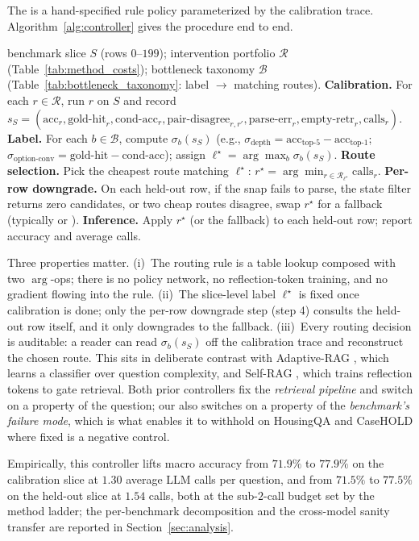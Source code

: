 The \controller{} is a hand-specified rule policy parameterized by the
calibration trace. Algorithm~\ref{alg:controller} gives the procedure end
to end.

\begin{algorithm*}[t]
\caption{Bottleneck-aware diagnostic adaptation.}
\label{alg:controller}
\begin{algorithmic}[1]
\REQUIRE benchmark slice $S$ (rows $0$--$199$); intervention portfolio $\mathcal{R}$ (Table~\ref{tab:method_costs}); bottleneck taxonomy $\mathcal{B}$ (Table~\ref{tab:bottleneck_taxonomy}: label $\to$ matching routes).
\STATE \textbf{Calibration.} For each $r \in \mathcal{R}$, run $r$ on $S$ and record $s_S = (\text{acc}_r, \text{gold-hit}_r, \text{cond-acc}_r, \text{pair-disagree}_{r,r'}, \text{parse-err}_r, \text{empty-retr}_r, \text{calls}_r)$.
\STATE \textbf{Label.} For each $b \in \mathcal{B}$, compute $\sigma_b(s_S)$ (e.g., $\sigma_{\text{depth}} = \text{acc}_{\text{top-5}} - \text{acc}_{\text{top-1}}$; $\sigma_{\text{option-conv}} = \text{gold-hit} - \text{cond-acc}$); assign $\ell^\star = \arg\max_b \sigma_b(s_S)$.
\STATE \textbf{Route selection.} Pick the cheapest route matching $\ell^\star$: $r^\star = \arg\min_{r \in \mathcal{R}_{\ell^\star}} \text{calls}_r$.
\STATE \textbf{Per-row downgrade.} On each held-out row, if the snap fails to parse, the state filter returns zero candidates, or two cheap routes disagree, swap $r^\star$ for a fallback (typically  or ).
\STATE \textbf{Inference.} Apply $r^\star$ (or the fallback) to each held-out row; report accuracy and average calls.
\end{algorithmic}
\end{algorithm*}

Three properties matter. (i)~The routing rule is a table lookup composed
with two $\arg$-ops; there is no policy network, no reflection-token
training, and no gradient flowing into the rule. (ii)~The slice-level
label $\ell^\star$ is fixed once calibration is done; only the per-row
downgrade step (step 4) consults the held-out row itself, and it only
downgrades to the fallback. (iii)~Every routing decision is auditable: a
reader can read $\sigma_b(s_S)$ off the calibration trace and reconstruct
the chosen route. This sits in deliberate contrast with Adaptive-RAG
\citep{jeong2024adaptive}, which learns a classifier over question
complexity, and Self-RAG \citep{asai2024selfrag}, which trains reflection
tokens to gate retrieval. Both prior controllers fix the
\emph{retrieval pipeline} and switch on a property of the question; our
\controller{} also switches on a property of the \emph{benchmark's
failure mode}, which is what enables it to withhold \hyre{} on HousingQA
and CaseHOLD where fixed \hyre{} is a negative control.

Empirically, this controller lifts macro accuracy from $71.9\%$ to
$77.9\%$ on the calibration slice at $1.30$ average LLM calls per
question, and from $71.5\%$ to $77.5\%$ on the held-out slice at $1.54$
calls, both at the sub-$2$-call budget set by the method ladder; the
per-benchmark decomposition and the cross-model sanity transfer are
reported in Section~\ref{sec:analysis}.
